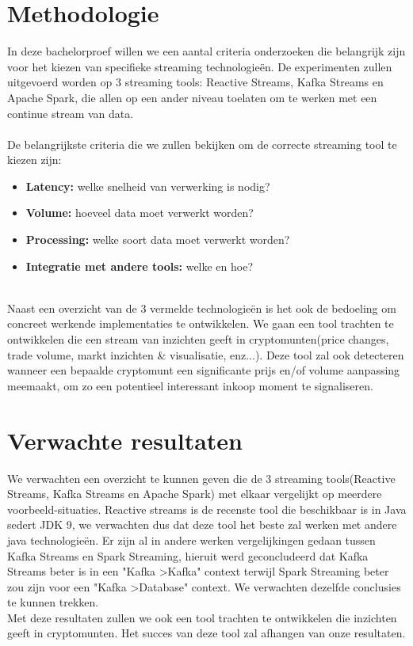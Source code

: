 \section{Methodologie}
\label{sec:methodologie}

In deze bachelorproef willen we een aantal criteria onderzoeken die belangrijk zijn voor het kiezen van specifieke streaming technologieën.
De experimenten zullen uitgevoerd worden op 3 streaming tools: Reactive Streams, Kafka Streams en Apache Spark, die allen op een ander niveau toelaten om te werken met een continue stream van data.
\\ \\
De belangrijkste criteria die we zullen bekijken om de correcte streaming tool te kiezen zijn:
\begin{itemize}
	\item \textbf{Latency:} welke snelheid van verwerking is nodig?
	\item \textbf{Volume:} hoeveel data moet verwerkt worden?
	\item \textbf{Processing:} welke soort data moet verwerkt worden?
	\item \textbf{Integratie met andere tools:} welke en hoe?
\end{itemize}
\ \\
Naast een overzicht van de 3 vermelde technologieën is het ook de bedoeling om concreet werkende implementaties te ontwikkelen.
We gaan een tool trachten te ontwikkelen die een stream van inzichten geeft in cryptomunten(price changes, trade volume, markt inzichten \& visualisatie, enz...).
Deze tool zal ook detecteren wanneer een bepaalde cryptomunt een significante prijs en/of volume aanpassing meemaakt, om zo een potentieel interessant inkoop moment te signaliseren.

\section{Verwachte resultaten}
\label{sec:verwachte_resultaten}

We verwachten een overzicht te kunnen geven die de 3 streaming tools(Reactive Streams, Kafka Streams en Apache Spark) met elkaar vergelijkt op meerdere voorbeeld-situaties.
\newline
Reactive streams is de recenste tool die beschikbaar is in Java sedert JDK 9, we verwachten dus dat deze tool het beste zal werken met andere java technologieën.
\newline
Er zijn al in andere werken vergelijkingen gedaan tussen Kafka Streams en Spark Streaming, hieruit werd geconcludeerd dat Kafka Streams beter is in een "Kafka \textgreater\space Kafka" \space context terwijl Spark Streaming beter zou zijn voor een "Kafka \textgreater\space Database" \space context.
We verwachten dezelfde conclusies te kunnen trekken.
\\
Met deze resultaten zullen we ook een tool trachten te ontwikkelen die inzichten geeft in cryptomunten. Het succes van deze tool zal afhangen van onze resultaten.


